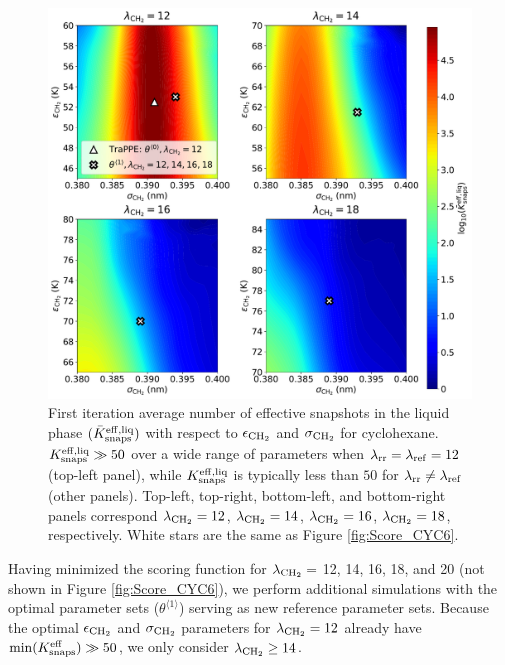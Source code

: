 \documentclass[journal=jced,manuscript=article]{achemso}
\begin{document}
	\begin{figure}[htb!]
		\centering
		\includegraphics[width=6.4in]{CYC6_Neff_lam.pdf}
		\caption{First iteration average number of effective snapshots in the liquid phase $(\bar K_{\rm snaps}^{\rm eff, liq})$ with respect to $\epsilon_{\rm CH_2}$ and $\sigma_{\rm CH_2}$ for cyclohexane. $K_{\rm snaps}^{\rm eff, liq} \gg 50$ over a wide range of parameters when $\lambda_{\rm rr} = \lambda_{\rm ref} = 12$ (top-left panel), while $K_{\rm snaps}^{\rm eff, liq}$ is typically less than $50$ for $\lambda_{\rm rr} \neq \lambda_{\rm ref}$ (other panels). Top-left, top-right, bottom-left, and bottom-right panels correspond $\lambda_{\rm CH_2} = 12$, $\lambda_{\rm CH_2} = 14$, $\lambda_{\rm CH_2} = 16$, $\lambda_{\rm CH_2} = 18$, respectively. White stars are the same as Figure \ref{fig:Score_CYC6}.}%
		\label{fig:Neff_CYC6}
	\end{figure}

Having minimized the scoring function for $\lambda_{\rm CH_2} =$ 12, 14, 16, 18, and 20 (not shown in Figure \ref{fig:Score_CYC6}), we perform additional simulations with the optimal parameter sets ($\theta^{\langle1\rangle}$) serving as new reference parameter sets. Because the optimal $\epsilon_{\rm CH_2}$ and $\sigma_{\rm CH_2}$ parameters for $\lambda_{\rm CH_2} = 12$ already have $\min(K_{\rm snaps}^{\rm eff}) \gg 50$, we only consider $\lambda_{\rm CH_2} \ge 14$. 
\end{document}

